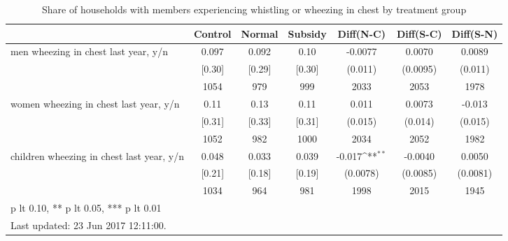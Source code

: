 \begin{table}[htbp]\centering
\def\sym#1{\ifmmode^{#1}\else\(^{#1}\)\fi}
\caption{Share of households with members experiencing whistling or wheezing in chest by treatment group \label{tab:"balance"}}
\begin{tabular*}{1\hsize}{@{\hskip\tabcolsep\extracolsep\fill}l*{1}{cccccc}}
\toprule
                                &  Control&   Normal&  Subsidy&Diff(N-C)         &Diff(S-C)         &Diff(S-N)         \\
\midrule
men wheezing in chest last year, y/n&    0.097&    0.092&     0.10&  -0.0077         &   0.0070         &   0.0089         \\
                                &   [0.30]&   [0.29]&   [0.30]&  (0.011)         & (0.0095)         &  (0.011)         \\
                                &     1054&      979&      999&     2033         &     2053         &     1978         \\
women wheezing in chest last year, y/n&     0.11&     0.13&     0.11&    0.011         &   0.0073         &   -0.013         \\
                                &   [0.31]&   [0.33]&   [0.31]&  (0.015)         &  (0.014)         &  (0.015)         \\
                                &     1052&      982&     1000&     2034         &     2052         &     1982         \\
children wheezing in chest last year, y/n&    0.048&    0.033&    0.039&   -0.017\sym{**} &  -0.0040         &   0.0050         \\
                                &   [0.21]&   [0.18]&   [0.19]& (0.0078)         & (0.0085)         & (0.0081)         \\
                                &     1034&      964&      981&     1998         &     2015         &     1945         \\
\bottomrule
\multicolumn{7}{l}{\footnotesize * p lt 0.10, ** p lt 0.05, *** p lt 0.01}\\
\multicolumn{7}{l}{\footnotesize Last updated: 23 Jun 2017 12:11:00.}\\
\end{tabular*}
\end{table}
